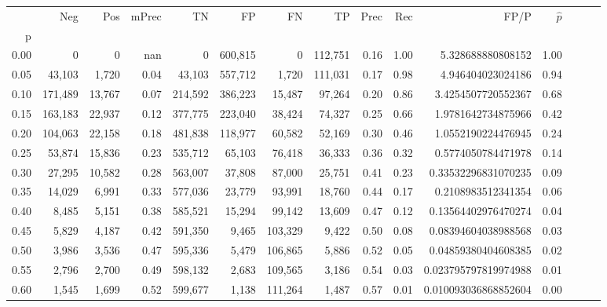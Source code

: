 \begin{tabular}{rrrrrrrrrrrrrrr}
\toprule
{} &      Neg &     Pos & mPrec &       TN &       FP &       FN &       TP &  Prec &   Rec &                   FP/P & $\hat{p}$ \\
p    &          &         &       &          &          &          &          &       &       &                        &           \\
\midrule
0.00 &        0 &       0 &   nan &        0 &  600,815 &        0 &  112,751 &  0.16 &  1.00 &      5.328688880808152 &      1.00 \\
0.05 &   43,103 &   1,720 &  0.04 &   43,103 &  557,712 &    1,720 &  111,031 &  0.17 &  0.98 &      4.946404023024186 &      0.94 \\
0.10 &  171,489 &  13,767 &  0.07 &  214,592 &  386,223 &   15,487 &   97,264 &  0.20 &  0.86 &     3.4254507720552367 &      0.68 \\
0.15 &  163,183 &  22,937 &  0.12 &  377,775 &  223,040 &   38,424 &   74,327 &  0.25 &  0.66 &     1.9781642734875966 &      0.42 \\
0.20 &  104,063 &  22,158 &  0.18 &  481,838 &  118,977 &   60,582 &   52,169 &  0.30 &  0.46 &     1.0552190224476945 &      0.24 \\
0.25 &   53,874 &  15,836 &  0.23 &  535,712 &   65,103 &   76,418 &   36,333 &  0.36 &  0.32 &     0.5774050784471978 &      0.14 \\
0.30 &   27,295 &  10,582 &  0.28 &  563,007 &   37,808 &   87,000 &   25,751 &  0.41 &  0.23 &    0.33532296831070235 &      0.09 \\
0.35 &   14,029 &   6,991 &  0.33 &  577,036 &   23,779 &   93,991 &   18,760 &  0.44 &  0.17 &     0.2108983512341354 &      0.06 \\
0.40 &    8,485 &   5,151 &  0.38 &  585,521 &   15,294 &   99,142 &   13,609 &  0.47 &  0.12 &    0.13564402976470274 &      0.04 \\
0.45 &    5,829 &   4,187 &  0.42 &  591,350 &    9,465 &  103,329 &    9,422 &  0.50 &  0.08 &    0.08394604038988568 &      0.03 \\
0.50 &    3,986 &   3,536 &  0.47 &  595,336 &    5,479 &  106,865 &    5,886 &  0.52 &  0.05 &    0.04859380404608385 &      0.02 \\
0.55 &    2,796 &   2,700 &  0.49 &  598,132 &    2,683 &  109,565 &    3,186 &  0.54 &  0.03 &   0.023795797819974988 &      0.01 \\
0.60 &    1,545 &   1,699 &  0.52 &  599,677 &    1,138 &  111,264 &    1,487 &  0.57 &  0.01 &   0.010093036868852604 &      0.00 \\

\end{tabular}
